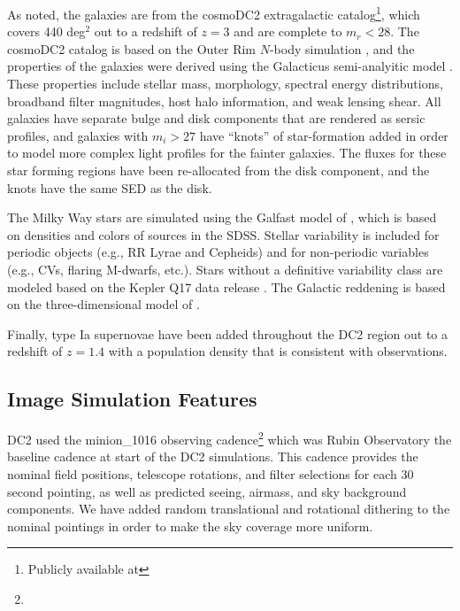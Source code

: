 \documentclass[11pt]{report}
\begin{document}
As noted, the galaxies are from the cosmoDC2 extragalactic catalog\footnote{Publicly available at }, which covers 440 deg$^2$ out to a redshift of $z = 3$ and are complete to $m_r <28$.  The cosmoDC2 catalog is based on the Outer Rim $N$-body simulation \citep{2019ApJS..245...16H}, and the properties of the galaxies were derived using the Galacticus semi-analyitic model \citep{benson_2010b}.  These properties include stellar mass, morphology, spectral energy distributions, broadband filter magnitudes, host halo information, and weak lensing shear.  All galaxies have separate bulge and disk components that are rendered as sersic profiles, and galaxies with $m_i > 27$ have ``knots'' of star-formation added in order to model more complex light profiles for the fainter galaxies. The fluxes for these star forming regions have been re-allocated from the disk component, and the knots have the same SED as the disk.

The Milky Way stars are simulated using the Galfast model of \citet{2008ApJ...673..864J}, which is based on densities and colors of sources in the SDSS. Stellar variability is included for periodic objects (e.g., RR Lyrae and Cepheids) and for non-periodic variables (e.g., CVs, flaring M-dwarfs, etc.).  Stars without a definitive variability class are modeled based on the Kepler Q17 data release \citep{2016ksci.rept....3T}.  The Galactic reddening is based on the three-dimensional model of \cite{2005AJ....130..659A}.

Finally, type Ia supernovae have been added throughout the DC2 region out to a redshift of $z=1.4$ with a population density that is consistent with observations.

\subsection{Image Simulation Features}

DC2 used the minion\_1016 observing cadence\footnote{} which was Rubin Observatory the baseline cadence at start of the DC2 simulations. This cadence provides the nominal field positions, telescope rotations, and filter selections for each 30 second pointing, as well as predicted seeing, airmass, and sky background components.  We have added random translational and rotational dithering to the nominal pointings in order to make the sky coverage more uniform.
\end{document}
